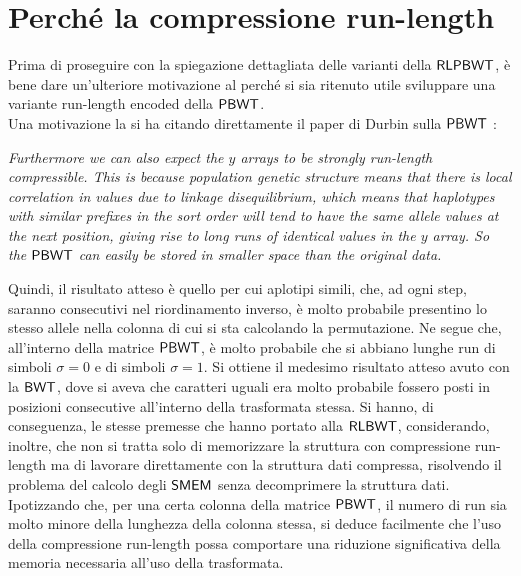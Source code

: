 \section{Perché la compressione run-length}
Prima di proseguire con la spiegazione dettagliata delle varianti della
$\mbox{\rm {\sf RLPBWT}}$, è bene dare 
un'ulteriore motivazione al perché si sia ritenuto utile sviluppare una variante
run-length encoded della $\mbox{\rm {\sf PBWT}}$.\\
Una motivazione la si ha citando direttamente il paper di Durbin sulla
$\mbox{\rm {\sf PBWT}}$ \cite{pbwt}: 
\begin{center}
  \textit{Furthermore we can also expect the $y$ arrays to be strongly
    run-length compressible. This is because population genetic structure means
    that there 
    is local correlation in values due to linkage disequilibrium, which means
    that haplotypes with similar prefixes in the sort order will tend to have
    the same allele values at the next position, giving rise to long runs of
    identical values in the $y$ array. So the $\mbox{\rm {\sf PBWT}}$ can easily be stored in
    smaller space than the original data.} 
\end{center}
Quindi, il risultato atteso è quello per cui aplotipi simili, che, ad ogni step,
saranno consecutivi nel riordinamento inverso, è molto probabile presentino lo
stesso 
allele nella colonna di cui si sta calcolando la
permutazione. Ne segue che, all'interno della matrice $\mbox{\rm {\sf PBWT}}$, è molto
probabile che si abbiano lunghe run di simboli $\sigma=0$ e di simboli
$\sigma=1$.
Si ottiene il medesimo risultato atteso avuto con
la $\mbox{\rm {\sf BWT}}$, dove si aveva che caratteri uguali era molto probabile fossero posti
in posizioni consecutive all'interno della trasformata stessa. Si hanno, di
conseguenza, le
stesse premesse che hanno portato alla $\mbox{\rm {\sf RLBWT}}$, considerando, inoltre,
che non si tratta solo di memorizzare la struttura con
compressione run-length ma di lavorare direttamente con la struttura dati
compressa, risolvendo il problema del calcolo degli $\mbox{\rm {\sf SMEM}}$ senza
decomprimere la struttura dati. Ipotizzando che, per una certa colonna della
matrice $\mbox{\rm {\sf PBWT}}$, il numero di run sia molto minore della lunghezza della
colonna stessa, si deduce facilmente che l'uso della compressione run-length
possa comportare una riduzione significativa della memoria necessaria all'uso
della trasformata.
